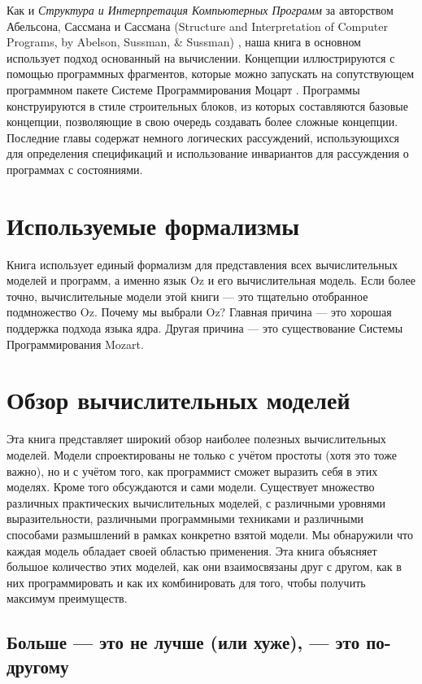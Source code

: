 Как и \emph{Структура и Интерпретация Компьютерных Программ} за авторством Абельсона, Сассмана и Сассмана (Structure and Interpretation of Computer Programs, by Abelson, Sussman, \& Sussman) \cite{1, 2}, наша книга в основном использует подход основанный на вычислении. Концепции иллюстрируются с помощью программных фрагментов, которые можно запускать на сопутствующем программном пакете Системе Программирования Моцарт \cite{129}. Программы конструируются в стиле строительных блоков, из которых составляются базовые концепции, позволяющие в свою очередь создавать более сложные концепции. Последние главы содержат немного логических рассуждений, использующихся для определения спецификаций и использование инвариантов для рассуждения о программах с состояниями.

\section*{Используемые формализмы}

Книга использует единый формализм для представления всех вычислительных моделей и программ, а именно язык Oz и его вычислительная модель. Если более точно, вычислительные модели этой книги --- это тщательно отобранное подмножество Oz. Почему мы выбрали Oz? Главная причина --- это хорошая поддержка подхода языка ядра. Другая причина --- это существование Системы Программирования Mozart.

\section*{Обзор вычислительных моделей}

Эта книга представляет широкий обзор наиболее полезных вычислительных моделей. Модели спроектированы не только с учётом простоты (хотя это тоже важно), но и с учётом того, как программист сможет выразить себя в этих моделях. Кроме того обсуждаются и сами модели. Существует множество различных практических вычислительных моделей, с различными уровнями выразительности, различными программными техниками и различными способами размышлений в рамках конкретно взятой модели. Мы обнаружили что каждая модель обладает своей областью применения. Эта книга объясняет большое количество этих моделей, как они взаимосвязаны друг с другом, как в них программировать и как их комбинировать для того, чтобы получить максимум преимуществ.

\subsection*{Больше --- это не лучше (или хуже), --- это по-другому}

